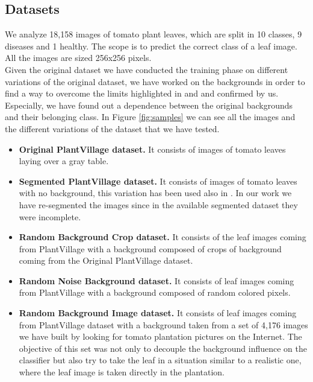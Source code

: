 \subsection{Datasets}
We analyze 18,158 images of tomato plant leaves, which are split in 10 classes, 9 diseases and 1 healthy. The scope is to predict the correct class of a leaf image. All the images are sized 256x256 pixels. 
\\\indent Given the original dataset we have conducted the training phase on different variations of the original dataset, we have worked on the backgrounds in order to find a way to overcome the limits highlighted in \cite{ref10} and \cite{manzoni} and confirmed by us. Especially, we have found out a dependence between the original backgrounds and their belonging class.
In Figure \ref{fig:samples} we can see all the images and the different variations of the dataset that we have tested.
\begin{itemize}
	\item{\textbf{Original PlantVillage dataset.} It consists of images of tomato leaves laying over a gray table.}
	\vspace{-5pt}
	\item{\textbf{Segmented PlantVillage dataset.} It consists of images of tomato leaves with no background, this variation has been used also in \cite{ref10}. In our work we have re-segmented the images since in the available segmented dataset they were incomplete.}
	\vspace{-5pt}
	\item{\textbf{Random Background Crop dataset.} It consists of the leaf images coming from PlantVillage with a background composed of crops of background coming from the Original PlantVillage dataset.}
	\vspace{-5pt}
	\item{\textbf{Random Noise Background dataset.} It consists of leaf images coming from PlantVillage with a background composed of random colored pixels.}
	\vspace{-5pt}
	\item{\textbf{Random Background Image dataset.} It consists of leaf images coming from PlantVillage dataset with a background taken from a set of 4,176 images we have built by looking for tomato plantation pictures on the Internet. The objective of this set was not only to decouple the background influence on the classifier but also try to take the leaf in a situation similar to a realistic one, where the leaf image is taken directly in the plantation.}
\end{itemize}
